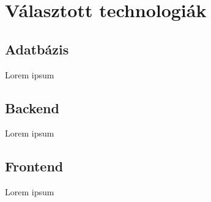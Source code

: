 \chapter{Választott technologiák}


\section{Adatbázis}

Lorem ipsum

\section{Backend}

Lorem ipsum

\section{Frontend}

Lorem ipsum

